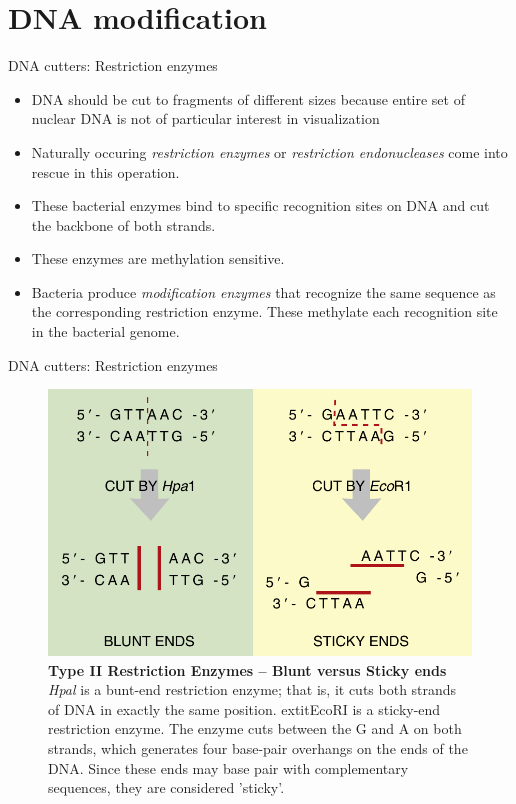 \documentclass[ignorenonframetext,aspectratio=169]{beamer}
\providecommand{\tightlist}{%
  \setlength{\itemsep}{0pt}\setlength{\parskip}{0pt}}
\begin{document}
\hypertarget{dna-modification}{%
\section{DNA modification}\label{dna-modification}}

\begin{frame}{DNA cutters: Restriction enzymes}
\protect\hypertarget{dna-cutters-restriction-enzymes}{}

\begin{itemize}
\tightlist
\item
  DNA should be cut to fragments of different sizes because entire set
  of nuclear DNA is not of particular interest in visualization
\item
  Naturally occuring \emph{restriction enzymes} or \emph{restriction
  endonucleases} come into rescue in this operation.
\item
  These bacterial enzymes bind to specific recognition sites on DNA and
  cut the backbone of both strands.
\item
  These enzymes are methylation sensitive.
\item
  Bacteria produce \emph{modification enzymes} that recognize the same
  sequence as the corresponding restriction enzyme. These methylate each
  recognition site in the bacterial genome.
\end{itemize}

\end{frame}

\begin{frame}{DNA cutters: Restriction enzymes}
\protect\hypertarget{dna-cutters-restriction-enzymes-1}{}

\begin{figure}
\includegraphics[width=0.5\linewidth]{./../images/restriction_enzymes} \caption{\textbf{Type II Restriction Enzymes -- Blunt versus Sticky ends} \newline \textit{Hpal} is a bunt-end restriction enzyme; that is, it cuts both strands of DNA in exactly the same position.    extit{EcoR}I is a sticky-end restriction enzyme. The enzyme cuts between the G and A on both strands, which generates four base-pair overhangs on the ends of the DNA. Since these ends may base pair with complementary sequences, they are considered 'sticky'.}\label{fig:restriction-enzymes}
\end{figure}

\end{frame}
\end{document}
